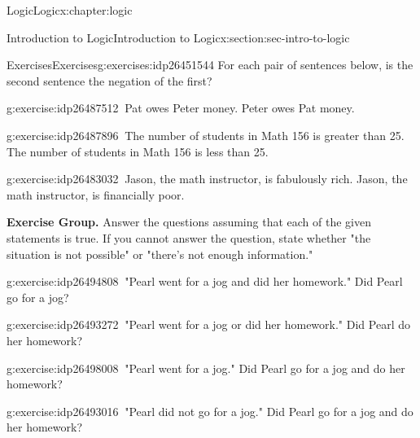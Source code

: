 \documentclass[twoside,10pt,]{book}
\numberwithin{equation}{section}
\begin{document}
\begin{chapterptx}{Logic}{}{Logic}{}{}{x:chapter:logic}
\begin{sectionptx}{Introduction to Logic}{}{Introduction to Logic}{}{}{x:section:sec-intro-to-logic}
\begin{exercises-subsection}{Exercises}{}{Exercises}{}{}{g:exercises:idp26451544}
For each pair of sentences below, is the second sentence the negation of the first?\begin{exercisegroup}
\begin{divisionexerciseeg}{27}{}{}{g:exercise:idp26487512}%
\(\ \)Pat owes Peter money.  Peter owes Pat money.\end{divisionexerciseeg}%
\begin{divisionexerciseeg}{28}{}{}{g:exercise:idp26487896}%
\(\ \)The number of students in Math 156 is greater than 25.  The number of students in Math 156 is less than 25.\end{divisionexerciseeg}%
\begin{divisionexerciseeg}{29}{}{}{g:exercise:idp26483032}%
\(\ \)Jason, the math instructor, is fabulously rich.  Jason, the math instructor, is financially poor.\end{divisionexerciseeg}%
\end{exercisegroup}
\par\medskip\noindent
\par\medskip\noindent%
\textbf{Exercise Group.}\space\space%
Answer the questions assuming that each of the given statements is true.  If you cannot answer the question, state whether "the situation is not possible" or "there's not enough information."\begin{exercisegroup}
\begin{divisionexerciseeg}{30}{}{}{g:exercise:idp26494808}%
\(\ \)"Pearl went for a jog and did her homework."  Did Pearl go for a jog?\end{divisionexerciseeg}%
\begin{divisionexerciseeg}{31}{}{}{g:exercise:idp26493272}%
\(\ \)"Pearl went for a jog or did her homework."  Did Pearl do her homework?\end{divisionexerciseeg}%
\begin{divisionexerciseeg}{32}{}{}{g:exercise:idp26498008}%
\(\ \)"Pearl went for a jog."  Did Pearl go for a jog and do her homework?\end{divisionexerciseeg}%
\begin{divisionexerciseeg}{33}{}{}{g:exercise:idp26493016}%
\(\ \)"Pearl did not go for a jog."  Did Pearl go for a jog and do her homework?\end{divisionexerciseeg}%
\end{exercisegroup}
\par\medskip\noindent
\end{exercises-subsection}
%
%
\typeout{************************************************}

\end{sectionptx}
\end{chapterptx}
\end{document}
